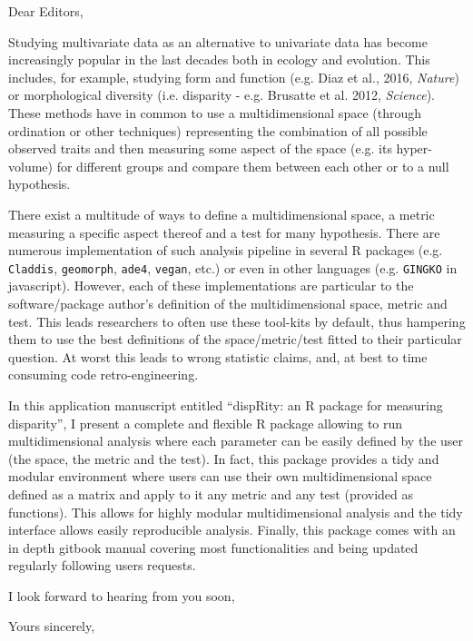 \documentclass[11pt]{letter}
\begin{document}
\begin{letter}{}
\opening{Dear Editors,}

Studying multivariate data as an alternative to univariate data has become increasingly popular in the last decades both in ecology and evolution.
This includes, for example, studying form and function (e.g. Diaz et al., 2016, \textit{Nature}) or morphological diversity (i.e. disparity - e.g. Brusatte et al. 2012, \textit{Science}).
These methods have in common to use a multidimensional space (through ordination or other techniques) representing the combination of all possible observed traits and then measuring some aspect of the space (e.g. its hyper-volume) for different groups and compare them between each other or to a null hypothesis.

There exist a multitude of ways to define a multidimensional space, a metric measuring a specific aspect thereof and a test for many hypothesis.
There are numerous implementation of such analysis pipeline in several R packages (e.g. \texttt{Claddis}, \texttt{geomorph}, \texttt{ade4}, \texttt{vegan}, etc.) or even in other languages (e.g. \texttt{GINGKO} in javascript).
However, each of these implementations are particular to the software/package author's definition of the multidimensional space, metric and test.
This leads researchers to often use these tool-kits by default, thus hampering them to use the best definitions of the space/metric/test fitted to their particular question.
At worst this leads to wrong statistic claims, and, at best to time consuming code retro-engineering.

In this application manuscript entitled ``dispRity: an R package for measuring disparity'', I present a complete and flexible R package allowing to run multidimensional analysis where each parameter can be easily defined by the user (the space, the metric and the test).
In fact, this package provides a tidy and modular environment where users can use their own multidimensional space defined as a matrix and apply to it any metric and any test (provided as functions).
This allows for highly modular multidimensional analysis and the tidy interface allows easily reproducible analysis.
Finally, this package comes with an in depth gitbook manual covering most functionalities and being updated regularly following users requests.

I look forward to hearing from you soon,

\closing{Yours sincerely,}

\end{letter}
\end{document}
